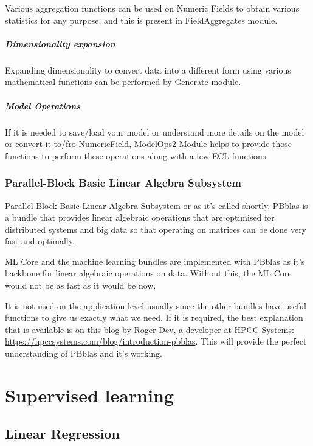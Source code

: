 \documentclass[a4paper,oneside,12pt]{book}
\begin{document}
Various aggregation functions can be used on Numeric Fields to obtain various statistics for any purpose, and this is present in FieldAggregates module.

\subsubsection{Dimensionality expansion}

Expanding dimensionality to convert data into a different form using various mathematical functions can be performed by Generate module.

\subsubsection{Model Operations}

If it is needed to save/load your model or understand more details on the model or convert it to/fro NumericField, ModelOps2 Module helps to provide those functions to perform these operations along with a few ECL functions.

\section{Parallel-Block Basic Linear Algebra Subsystem}\label{sec:pbblas}

Parallel-Block Basic Linear Algebra Subsystem or as it's called shortly, PBblas is a bundle that provides linear algebraic operations that are optimised for distributed systems and big data so that operating on matrices can be done very fast and optimally. 

ML Core and the machine learning bundles are implemented with PBblas as it's backbone for linear algebraic operations on data. Without this, the ML Core would not be as fast as it would be now. 

It is not used on the application level usually since the other bundles have useful functions to give us exactly what we need. If it is required, the best explanation that is available is on this blog by Roger Dev, a developer at HPCC Systems: \url{https://hpccsystems.com/blog/introduction-pbblas}. This will provide the perfect understanding of PBblas and it's working.

\part{Supervised learning}\label{part:supe}

\chapter{Linear Regression}\label{supe:linreg}
\end{document}
